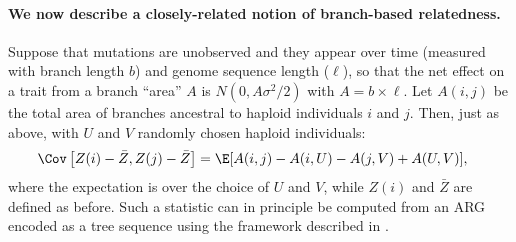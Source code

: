 
\paragraph{We now describe a closely-related notion of branch-based relatedness.}
%
Suppose that mutations are unobserved and they appear over time
(measured with branch length $b$) and genome sequence length ($\ell$),
so that the net effect on a trait from a branch
``area'' $A$ is $N(0, A \sigma^2 / 2)$ with $A = b \times \ell$.
%
Let $A(i,j)$ be the total area of branches ancestral to haploid individuals $i$ and $j$.
%
Then, just as above, with $U$ and $V$ randomly chosen haploid individuals:
%
\begin{align} \label{eqn:branch_cov} %
    \Cov\left[Z(i) - \bar{Z}, Z(j) - \bar{Z}\right] &= \E[A(i,j) - A(i,U) - A(j,V) + A(U,V)],
\end{align}
%
where the expectation is over the choice of $U$ and $V$,
while $Z(i)$ and $\bar{Z}$ are defined as before.
%
Such a statistic can in principle be computed from an ARG encoded as a
tree sequence using the framework described in \citep{ralph2020efficiently}.

%

